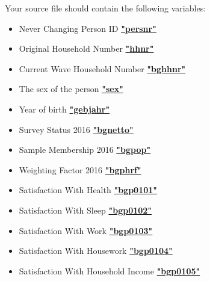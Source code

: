 \documentclass[letterpaper,10pt,openany,onesideH,english]{sphinxmanual}
\begin{document}
Your source file should contain the following variables:
\begin{itemize}
\item {} 
Never Changing Person ID  \href{https://paneldata.org/soep-core/data/ppfad/persnr}{\textbf{"persnr"}}

\item {} 
Original Household Number  \href{https://paneldata.org/soep-core/data/ppfad/hhnr}{\textbf{"hhnr"}}

\item {} 
Current Wave Household Number  \href{https://paneldata.org/soep-core/data/ppfad/bghhnr}{\textbf{"bghhnr"}}

\item {} 
The sex of the person  \href{https://paneldata.org/soep-core/data/ppfad/sex}{\textbf{"sex"}}

\item {} 
Year of birth  \href{https://paneldata.org/soep-core/data/ppfad/gebjahr}{\textbf{"gebjahr"}}

\item {} 
Survey Status 2016  \href{https://paneldata.org/soep-core/data/ppfad/bgnetto}{\textbf{"bgnetto"}}

\item {} 
Sample Membership 2016  \href{https://paneldata.org/soep-core/data/ppfad/bgpop}{\textbf{"bgpop"}}

\item {} 
Weighting Factor 2016  \href{https://paneldata.org/soep-core/data/phrf/bgphrf}{\textbf{"bgphrf"}}

\item {} 
Satisfaction With Health  \href{https://paneldata.org/soep-core/data/bgp/bgp0101}{\textbf{"bgp0101"}}

\item {} 
Satisfaction With Sleep  \href{https://paneldata.org/soep-core/data/bgp/bgp0102}{\textbf{"bgp0102"}}

\item {} 
Satisfaction With Work  \href{https://paneldata.org/soep-core/data/bgp/bgp0103}{\textbf{"bgp0103"}}

\item {} 
Satisfaction With Housework  \href{https://paneldata.org/soep-core/data/bgp/bgp0104}{\textbf{"bgp0104"}}

\item {} 
Satisfaction With Household Income  \href{https://paneldata.org/soep-core/data/bgp/bgp0105}{\textbf{"bgp0105"}}


\end{itemize}
\end{document}
